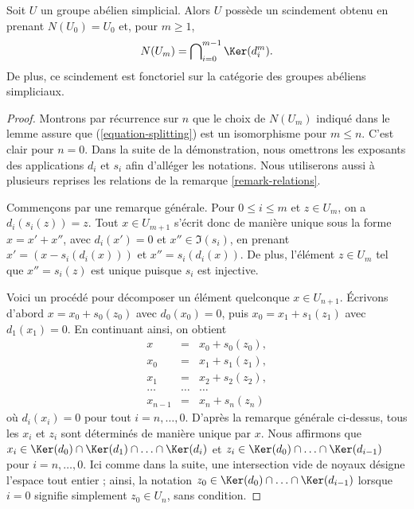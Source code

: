 \begin{lemma}
\label{lemma-splitting-simplicial-groups}
Soit $U$ un groupe abélien simplicial. Alors $U$ possède un scindement
obtenu en prenant $N(U_0) = U_0$ et, pour $m \geq 1$,
$$
N(U_m) = \bigcap\nolimits_{i = 0}^{m - 1} \Ker(d^m_i).
$$
De plus, ce scindement est fonctoriel sur la catégorie des groupes
abéliens simpliciaux.
\end{lemma}

\begin{proof}
Montrons par récurrence sur $n$ que le choix de $N(U_m)$ indiqué dans
le lemme assure que (\ref{equation-splitting}) est un isomorphisme pour
$m \leq n$. C'est clair pour $n = 0$. Dans la suite de la démonstration,
nous omettrons les exposants des applications $d_i$ et $s_i$ afin
d'alléger les notations. Nous utiliserons aussi à plusieurs reprises les
relations de la remarque \ref{remark-relations}.

\medskip\noindent
Commençons par une remarque générale. Pour $0 \leq i \leq m$ et
$z \in U_m$, on a $d_i(s_i(z)) = z$. Tout $x \in U_{m + 1}$ s'écrit
donc de manière unique sous la forme $x = x' + x''$, avec
$d_i(x') = 0$ et $x'' \in \Im(s_i)$, en prenant
$x' = (x - s_i(d_i(x)))$ et $x'' = s_i(d_i(x))$. De plus, l'élément
$z \in U_m$ tel que $x'' = s_i(z)$ est unique puisque $s_i$ est injective.

\medskip\noindent
Voici un procédé pour décomposer un élément quelconque
$x \in U_{n + 1}$. Écrivons d'abord
$x = x_0 + s_0(z_0)$ avec $d_0(x_0) = 0$, puis
$x_0 = x_1 + s_1(z_1)$ avec $d_1(x_1) = 0$. En continuant ainsi, on obtient
\begin{eqnarray*}
x & = & x_0 + s_0(z_0), \\
x_0 & = & x_1 + s_1(z_1), \\
x_1 & = & x_2 + s_2(z_2), \\
\ldots & \ldots & \ldots \\
x_{n - 1} & = & x_n + s_n(z_n)
\end{eqnarray*}
où $d_i(x_i) = 0$ pour tout $i = n, \ldots, 0$.
D'après la remarque générale ci-dessus, tous les $x_i$ et $z_i$ sont
déterminés de manière unique par $x$. Nous affirmons que
$x_i \in
\Ker(d_0) \cap
\Ker(d_1) \cap
\ldots \cap
\Ker(d_i)$
et
$z_i \in
\Ker(d_0) \cap
\ldots \cap
\Ker(d_{i - 1})$
pour $i = n, \ldots, 0$. Ici comme dans la suite, une intersection vide
de noyaux désigne l'espace tout entier ; ainsi, la notation
$z_0 \in \Ker(d_0) \cap
\ldots \cap
\Ker(d_{i - 1})$
lorsque $i = 0$ signifie simplement $z_0 \in U_n$, sans condition.


\end{proof}
